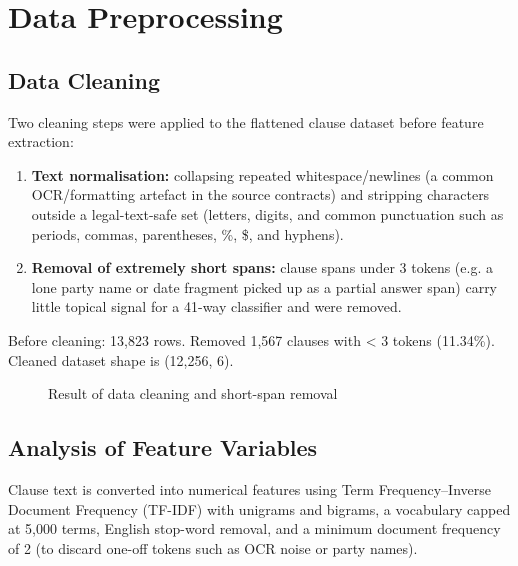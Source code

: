 \documentclass[12pt, a4paper]{report}
\begin{document}
\newpage

\section{Data Preprocessing}

\subsection{Data Cleaning}
\label{subsec:data_cleaning}
Two cleaning steps were applied to the flattened clause dataset before feature extraction:
\begin{enumerate}
    \item \textbf{Text normalisation:} collapsing repeated whitespace/newlines (a common OCR/formatting artefact in the source contracts) and stripping characters outside a legal-text-safe set (letters, digits, and common punctuation such as periods, commas, parentheses, \%, \$, and hyphens).
    \item \textbf{Removal of extremely short spans:} clause spans under 3 tokens (e.g. a lone party name or date fragment picked up as a partial answer span) carry little topical signal for a 41-way classifier and were removed.
\end{enumerate}

Before cleaning: 13,823 rows. Removed 1,567 clauses with < 3 tokens (11.34\%). Cleaned dataset shape is (12,256, 6).

\begin{figure}[h]
\centering
{}
\caption{Result of data cleaning and short-span removal}
\label{fig:cleaning_results}
\end{figure}

\subsection{Analysis of Feature Variables}
\label{subsec:feature_analysis}
Clause text is converted into numerical features using Term Frequency–Inverse Document Frequency (TF-IDF) with unigrams and bigrams, a vocabulary capped at 5,000 terms, English stop-word removal, and a minimum document frequency of 2 (to discard one-off tokens such as OCR noise or party names).
\end{document}
